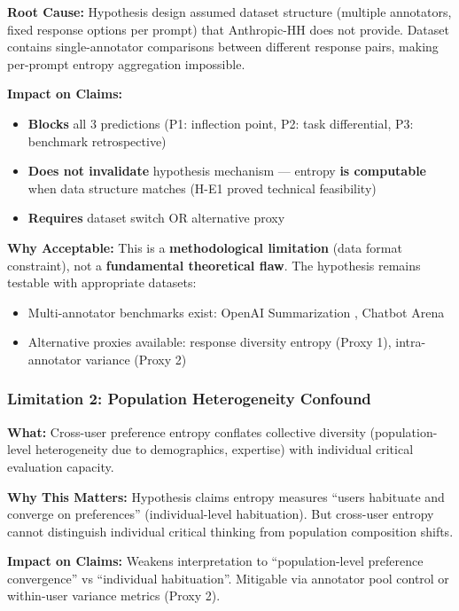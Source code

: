 \textbf{Root Cause:} Hypothesis design assumed dataset structure (multiple annotators, fixed response options per prompt) that Anthropic-HH does not provide. Dataset contains single-annotator comparisons between different response pairs, making per-prompt entropy aggregation impossible.

\textbf{Impact on Claims:}
\begin{itemize}
\item \textbf{Blocks} all 3 predictions (P1: inflection point, P2: task differential, P3: benchmark retrospective)
\item \textbf{Does not invalidate} hypothesis mechanism — entropy \textbf{is computable} when data structure matches (H-E1 proved technical feasibility)
\item \textbf{Requires} dataset switch OR alternative proxy
\end{itemize}

\textbf{Why Acceptable:} This is a \textbf{methodological limitation} (data format constraint), not a \textbf{fundamental theoretical flaw}. The hypothesis remains testable with appropriate datasets:
\begin{itemize}
\item Multi-annotator benchmarks exist: OpenAI Summarization \cite{stiennon2020summarize}, Chatbot Arena
\item Alternative proxies available: response diversity entropy (Proxy 1), intra-annotator variance (Proxy 2)
\end{itemize}

\subsubsection{Limitation 2: Population Heterogeneity Confound}

\textbf{What:} Cross-user preference entropy conflates collective diversity (population-level heterogeneity due to demographics, expertise) with individual critical evaluation capacity.

\textbf{Why This Matters:} Hypothesis claims entropy measures ``users habituate and converge on preferences'' (individual-level habituation). But cross-user entropy cannot distinguish individual critical thinking from population composition shifts.

\textbf{Impact on Claims:} Weakens interpretation to ``population-level preference convergence'' vs ``individual habituation''. Mitigable via annotator pool control or within-user variance metrics (Proxy 2).


